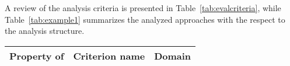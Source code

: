 A review of the analysis criteria is presented in Table~\ref{tab:evalcriteria}, while Table~\ref{tab:example1} summarizes the analyzed approaches with the respect to the analysis structure.




\begin{table*}[]
\scriptsize
\centering
\caption{Overview of evalution criteria. \label{tab:evalcriteria}}
\begin{tabular}{| c|c|c|}
\hline  \textbf{Property of}                                                              & \textbf{Criterion name}                                                                           & \textbf{Domain}                                                                             \\ \hline \hline

\hline


\end{tabular}
\end{table*}
